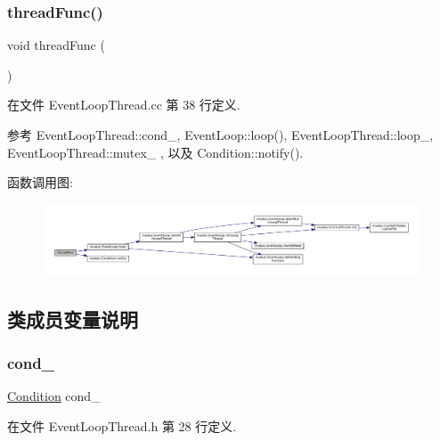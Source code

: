 \subsubsection{\texorpdfstring{thread\+Func()}{threadFunc()}}
{\footnotesize\ttfamily void thread\+Func (\begin{DoxyParamCaption}{ }\end{DoxyParamCaption})\hspace{0.3cm}{\ttfamily [private]}}



在文件 Event\+Loop\+Thread.\+cc 第 38 行定义.



参考 Event\+Loop\+Thread\+::cond\+\_\+, Event\+Loop\+::loop(), Event\+Loop\+Thread\+::loop\+\_\+, Event\+Loop\+Thread\+::mutex\+\_\+ , 以及 Condition\+::notify().

函数调用图\+:
\nopagebreak
\begin{figure}[H]
\begin{center}
\leavevmode
\includegraphics[width=350pt]{classmuduo_1_1EventLoopThread_a539feb3c59a20db3b260b312fa7dea34_cgraph}
\end{center}
\end{figure}


\subsection{类成员变量说明}
\mbox{\label{classmuduo_1_1EventLoopThread_ab88e8d399cbe9cffda0afb02110faa59}} 
\subsubsection{\texorpdfstring{cond\+\_\+}{cond\_}}
{\footnotesize\ttfamily \hyperlink{classmuduo_1_1Condition}{Condition} cond\+\_\+\hspace{0.3cm}{\ttfamily [private]}}



在文件 Event\+Loop\+Thread.\+h 第 28 行定义.



